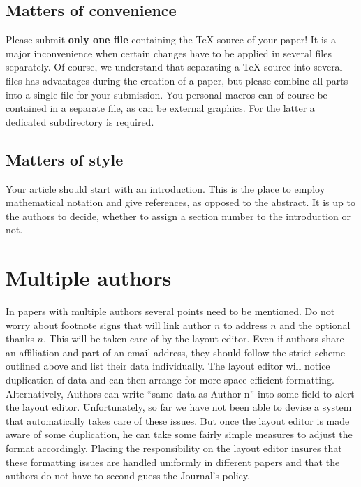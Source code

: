 \documentclass{jpc} %
\theoremstyle{plain}\newtheorem{satz}[thm]{Satz} %
\begin{document}
\subsection*{Matters of convenience}

  Please submit {\bf only one file} containing the
  TeX-source of your paper!  It is a major inconvenience when certain
  changes have to be applied in several files separately.  Of course,
  we understand that separating a TeX source into several files has
  advantages during the creation of a paper, but please combine all
  parts into a single file for your submission. You personal macros
  can of course be contained in a separate file, as can be external
  graphics.  For the latter a dedicated subdirectory is required.


\subsection*{Matters of style}

  Your article should start with an introduction.  This is the place
  to employ mathematical notation and give references, as opposed to
  the abstract.  It is up to the authors to decide, whether to assign
  a section number to the introduction or not.

\section{Multiple authors}

  In papers with multiple authors several points need to be mentioned.
  Do not worry about footnote signs that will link author $n$ to
  address $n$ and the optional thanks $n$.  This will be taken care of
  by the layout editor.  Even if authors share an affiliation and part
  of an email address, they should follow the strict scheme outlined
  above and list their data individually.  The layout editor will
  notice duplication of data and can then arrange for more
  space-efficient formatting.  Alternatively, Authors can write ``same
  data as Author n'' into some field to alert the layout editor.
  Unfortunately, so far we have not been able to devise a system that
  automatically takes care of these issues.  But once the layout
  editor is made aware of some duplication, he can take some fairly
  simple measures to adjust the format accordingly.  Placing the
  responsibility on the layout editor insures that these formatting
  issues are handled uniformly in different papers and that the
  authors do not have to second-guess the Journal's policy.
\end{document}
